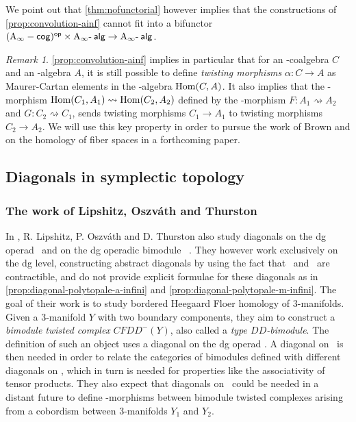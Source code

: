 \documentclass[twoside, 12pt]{amsart}
\theoremstyle{remark}
\newtheorem{remark}[definition]{\sc Remark}
\begin{document}
\noindent We point out that \cref{thm:nofunctorial} however implies that the constructions of \cref{prop:convolution-ainf} cannot fit into a bifunctor $\mathsf{(\mathrm{A}_\infty -cog)^{op}} \times \mathrm{A}_\infty\text{-\hspace{2pt}}\mathsf{alg} \rightarrow \mathrm{A}_\infty\text{-\hspace{2pt}}\mathsf{alg}$.

\begin{remark}
\cref{prop:convolution-ainf} implies in particular that for an \Ainf -coalgebra $C$ and an \Ainf -algebra $A$, it is still possible to define \textit{twisting morphisms} $\alpha : C \rightarrow A$ as Maurer-Cartan elements in the \Ainf -algebra $\mathrm{Hom} (C,A)$.
It also implies that the \Ainf -morphism $\mathrm{Hom} (C_1,A_1) \rightsquigarrow \mathrm{Hom} (C_2,A_2)$ defined by the \Ainf -morphism $F : A_1 \rightsquigarrow A_2$ and $G : C_2 \rightsquigarrow C_1$, sends twisting morphisms $C_1 \rightarrow A_1$ to twisting morphisms $C_2 \rightarrow A_2$.
We will use this key property in order to pursue the work of Brown \cite{Brown59} and \cite{Proute86} on the homology of fiber spaces in a forthcoming paper.
\end{remark}


\subsection{Diagonals in symplectic topology} \label{ss:diag-symp}

\subsubsection{The work of Lipshitz, {Oszv\'ath} and Thurston}

In \cite{LOT20}, R. Lipshitz, P. Oszv\'ath and D. Thurston also study diagonals on the dg operad \Ainf\ and on the dg operadic bimodule \Minf\ . They however work exclusively on the dg level, constructing abstract diagonals by using the fact that \Ainf\ and \Minf\ are contractible, and do not provide explicit formulae for these diagonals as in \cref{prop:diagonal-polytopale-a-infini} and \cref{prop:diagonal-polytopale-m-infini}. The goal of their work is to study bordered Heegaard Floer homology of 3-manifolds.
Given a 3-manifold $Y$ with two boundary components, they aim to construct a \emph{bimodule twisted complex} $CFDD^-(Y)$, also called a \emph{type $DD$-bimodule}. The definition of such an object uses a diagonal on the dg operad \Ainf . A diagonal on \Minf\ is then needed in order to relate the categories of bimodules defined with different diagonals on \Ainf , which in turn is needed for properties like the associativity of tensor products. They also expect that diagonals on \Minf\ could be needed in a distant future to define \Ainf -morphisms between bimodule twisted complexes arising from a cobordism between 3-manifolds $Y_1$ and $Y_2$.
\end{document}
